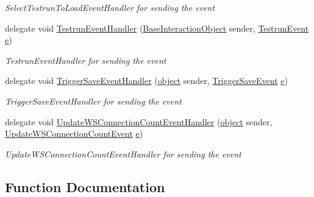 \begin{DoxyCompactItemize}
\begin{DoxyCompactList}\small\item\em Select\+Testrun\+To\+Load\+Event\+Handler for sending the event \end{DoxyCompactList}\item 
delegate void \hyperlink{namespace_web_analyzer_1_1_events_ac749d30657662c0b107ea3e49caae8d9}{Testrun\+Event\+Handler} (\hyperlink{class_web_analyzer_1_1_u_i_1_1_interaction_objects_1_1_base_interaction_object}{Base\+Interaction\+Object} sender, \hyperlink{class_web_analyzer_1_1_events_1_1_testrun_event}{Testrun\+Event} \hyperlink{_u_i_2_h_t_m_l_resources_2js_2lib_2bootstrap_8min_8js_ab5902775854a8b8440bcd25e0fe1c120}{e})
\begin{DoxyCompactList}\small\item\em Testrun\+Event\+Handler for sending the event \end{DoxyCompactList}\item 
delegate void \hyperlink{namespace_web_analyzer_1_1_events_a8e8e2ff467a5d5522ce9d3df28198ccf}{Trigger\+Save\+Event\+Handler} (\hyperlink{_u_i_2_h_t_m_l_resources_2js_2lib_2underscore_8min_8js_aae18b7515bb2bc4137586506e7c0c903}{object} sender, \hyperlink{class_web_analyzer_1_1_events_1_1_trigger_save_event}{Trigger\+Save\+Event} \hyperlink{_u_i_2_h_t_m_l_resources_2js_2lib_2bootstrap_8min_8js_ab5902775854a8b8440bcd25e0fe1c120}{e})
\begin{DoxyCompactList}\small\item\em Trigger\+Save\+Event\+Handler for sending the event \end{DoxyCompactList}\item 
delegate void \hyperlink{namespace_web_analyzer_1_1_events_a60ab58d669ec03a2518a57dba5a59e0e}{Update\+W\+S\+Connection\+Count\+Event\+Handler} (\hyperlink{_u_i_2_h_t_m_l_resources_2js_2lib_2underscore_8min_8js_aae18b7515bb2bc4137586506e7c0c903}{object} sender, \hyperlink{class_web_analyzer_1_1_events_1_1_update_w_s_connection_count_event}{Update\+W\+S\+Connection\+Count\+Event} \hyperlink{_u_i_2_h_t_m_l_resources_2js_2lib_2bootstrap_8min_8js_ab5902775854a8b8440bcd25e0fe1c120}{e})
\begin{DoxyCompactList}\small\item\em Update\+W\+S\+Connection\+Count\+Event\+Handler for sending the event \end{DoxyCompactList}\end{DoxyCompactItemize}


\subsection{Function Documentation}
\hypertarget{namespace_web_analyzer_1_1_events_a7026c712fad5c0000a728950cb43c587}{}
